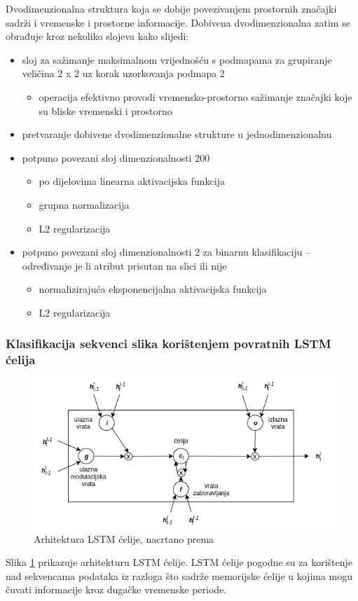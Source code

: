 \documentclass[times, utf8, diplomski, numeric]{fer}
\begin{document}
Dvodimenzionalna struktura koja se dobije povezivanjem prostornih značajki sadrži i vremenske i prostorne informacije. 
Dobivena dvodimenzionalna zatim se obrađuje kroz nekoliko slojeva kako slijedi:
\begin{itemize}
 \item sloj za sažimanje maksimalnom vrijednošću s podmapama za grupiranje veličina $2$ x $2$ uz korak uzorkovanja podmapa 2
 \begin{itemize}
  \item operacija efektivno provodi vremensko-prostorno sažimanje značajki koje su bliske vremenski i prostorno
 \end{itemize}
 \item pretvaranje dobivene dvodimenzionalne strukture u jednodimenzionalnu
 \item potpuno povezani sloj dimenzionalnosti 200
 \begin{itemize}
  \item po dijelovima linearna  aktivacijska funkcija
  \item grupna normalizacija 
  \item L2 regularizacija
 \end{itemize}
 \item potpuno povezani sloj dimenzionalnosti 2 za binarnu klasifikaciju -- određivanje je li atribut prisutan na slici ili nije
 \begin{itemize}
  \item normalizirajuća eksponencijalna  aktivacijska funkcija
  \item L2 regularizacija
 \end{itemize}
\end{itemize}

\subsubsection{Klasifikacija sekvenci slika korištenjem povratnih LSTM ćelija }
\begin{figure}[H]
\centering
\includegraphics[scale=0.6]{images/lstm.png}
\caption{Arhitektura LSTM ćelije, nacrtano prema \citep{article:lstm}}
\label{img:lstm}
\end{figure}
Slika \ref{img:lstm} prikazuje arhitekturu LSTM ćelije. 
LSTM ćelije pogodne su za korištenje nad sekvencama podataka iz razloga što sadrže memorijske ćelije u kojima mogu čuvati informacije kroz dugačke vremenske periode.
\end{document}
